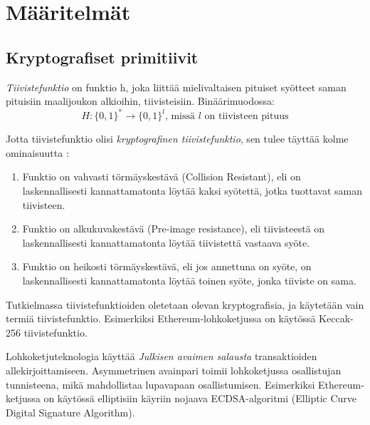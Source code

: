 \chapter{Määritelmät\label{methods}}

\section{Kryptografiset primitiivit}
\textit{Tiivistefunktio} on funktio h, joka liittää mielivaltaisen pituiset syötteet saman pituisiin maalijoukon alkioihin, tiivisteisiin. Binäärimuodossa: 
\begin{equation}
    H : \{0, 1\}^* \longrightarrow  \{0, 1\}^l \text{, missä $l$ on tiivisteen pituus}
\end{equation}

Jotta tiivistefunktio olisi \textit{kryptografinen tiivistefunktio}, sen tulee täyttää kolme ominaisuutta \cite{cryptoeprint:2011:565}: 
\begin{enumerate}
    \item Funktio on vahvasti törmäyskestävä (Collision Resistant), eli on laskennallisesti kannattamatonta löytää kaksi syötettä, jotka tuottavat saman tiivisteen.
    \item Funktio on alkukuvakestävä (Pre-image resistance), eli tiivisteestä on laskennallisesti kannattamatonta löytää tiivistettä vastaava syöte.
    \item Funktio on heikosti törmäyskestävä, eli jos annettuna on syöte, on laskennallisesti kannattamatonta löytää toinen syöte, jonka tiiviste on sama.
\end{enumerate}

Tutkielmassa tiivistefunktioiden oletetaan olevan kryptografisia, ja käytetään vain termiä tiivistefunktio. Esimerkiksi Ethereum-lohkoketjussa on käytössä Keccak-256 tiivistefunktio. 

Lohkoketjuteknologia käyttää \textit{Julkisen avaimen salausta} transaktioiden allekirjoittamiseen. Asymmetrinen avainpari toimii lohkoketjussa osallistujan tunnisteena, mikä mahdollistaa lupavapaan osallistumisen. Esimerkiksi Ethereum-ketjussa on käytössä elliptisiin käyriin nojaava ECDSA-algoritmi (Elliptic Curve Digital Signature Algorithm). 


